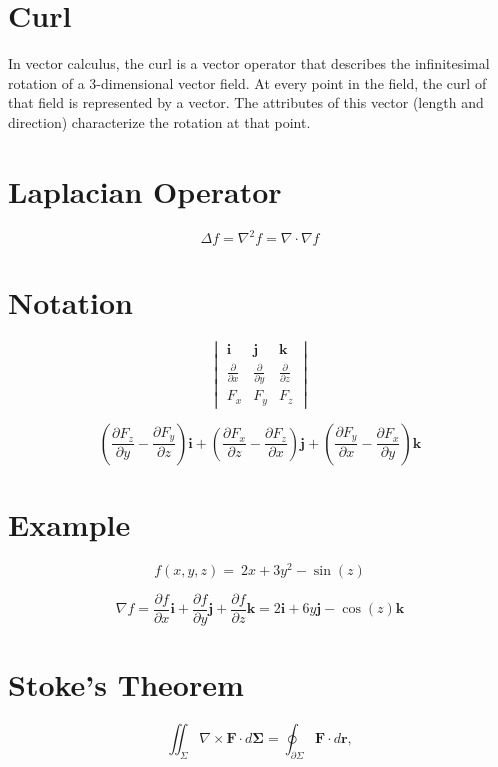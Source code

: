\documentclass[12pt, a4paper]{article}
\begin{document}
\section{Curl}
In vector calculus, the curl is a vector operator that describes the infinitesimal rotation of a 3-dimensional vector field. At every point in the field, the curl of that field is represented by a vector. The attributes of this vector (length and direction) characterize the rotation at that point.
\section{Laplacian Operator}
\[\Delta f = \nabla^2 f = \nabla \cdot \nabla f\]

\section{Notation}
\[ \begin{vmatrix} \mathbf{i} & \mathbf{j} & \mathbf{k} \\
{\frac{\partial}{\partial x}} & {\frac{\partial}{\partial y}} & {\frac{\partial}{\partial z}} \\
 F_x & F_y & F_z \end{vmatrix}\]

\[\left(\frac{\partial F_z}{\partial y}  - \frac{\partial F_y}{\partial z}\right) \mathbf{i} + \left(\frac{\partial F_x}{\partial z} - \frac{\partial F_z}{\partial x}\right) \mathbf{j} + \left(\frac{\partial F_y}{\partial x} - \frac{\partial F_x}{\partial y}\right) \mathbf{k}\]

\section{Example}
\[f(x,y,z)= \ 2x+3y^2-\sin(z)\]

\[ \nabla f=
\frac{\partial f}{\partial x} \mathbf{i} +
\frac{\partial f}{\partial y} \mathbf{j} +
\frac{\partial f}{\partial z} \mathbf{k}
 = 2\mathbf{i}+ 6y\mathbf{j} -\cos(z)\mathbf{k}\]

\section{Stoke's Theorem}
\[
\iint_{\Sigma} \nabla \times \mathbf{F} \cdot d\mathbf{\Sigma} = \oint_{\partial\Sigma} \mathbf{F} \cdot d \mathbf{r}, \]
\end{document}
